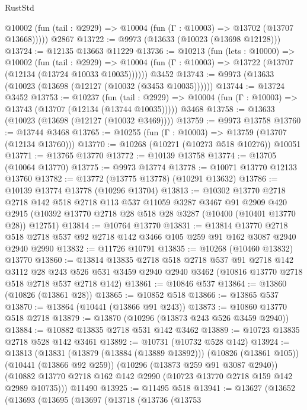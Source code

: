 \begin{lexlean}{RustStd}
\begin{coremodule}
      @10002 (fun (tail : @2929) => @10004 (fun (Γ : @10003) => @13702 (@13707 @13668)))))
    @2867
@13722 := @9973 (@13633 (@10023 (@13698 @12128)))
@13724 := @12135 @13663 @11229
@13736 := @10213
    (fun (lets : @10000) =>
    @10002
      (fun (tail : @2929) =>
      @10004 (fun (Γ : @10003) => @13722 (@13707 (@12134 (@13724 @10033 @10035))))))
    @3452
@13743 := @9973 (@13633 (@10023 (@13698 (@12127 (@10032 (@3453 @10035))))))
@13744 := @13724 @3452
@13753 := @10237
    (fun (tail : @2929) => @10004 (fun (Γ : @10003) => @13743 (@13707 (@12134 (@13744 @10035)))))
    @3468
@13758 := @13633 (@10023 (@13698 (@12127 (@10032 @3469))))
@13759 := @9973 @13758
@13760 := @13744 @3468
@13765 := @10255 (fun (Γ : @10003) => @13759 (@13707 (@12134 @13760)))
@13770 := @10268 (@10271 (@10273 @518 @10276)) @10051
@13771 := @13765 @13770
@13772 := @10139 @13758
@13774 := @13705 (@10064 @13770)
@13775 := @9973 @13774
@13778 := @10071 @13770 @12133 @13760
@13782 := @13772 (@13775 @13778) (@10291 @13632)
@13786 := @10139 @13774 @13778 (@10296 @13704)
@13813 := @10302
    @13770
    @2718
    @2718
    @142
    @518
    @2718
    @113
    @537
    @11059
    @3287
    @3467
    @91
    @2909
    @420
    @2915
    (@10392 @13770 @2718 @28 @518 @28 @3287 (@10400 (@10401 @13770 @28)) @12751)
@13814 := @10764 @13770
@13831 := @13814
    @13770
    @2718
    @518
    @2718
    @537
    @92
    @2718
    @142
    @3466
    @105
    @259
    @91
    @162
    @3087
    @2940
    @2940
    @2990
@13832 := @11726 @10791
@13835 := @10268 (@10460 @13832) @13770
@13860 := @13814
    @13835
    @2718
    @518
    @2718
    @537
    @91
    @2718
    @142
    @3112
    @28
    @243
    @526
    @531
    @3459
    @2940
    @2940
    @3462
    (@10816 @13770 @2718 @518 @2718 @537 @2718 @142)
@13861 := @10846 @537
@13864 := @13860 (@10826 (@13861 @28))
@13865 := @10852 @518
@13866 := @13865 @537
@13870 := @13864 (@10441 (@13866 @91 @243))
@13873 := @10860 @13770 @518 @2718
@13879 := @13870 (@10296 (@13873 @243 @526 @3459 @2940))
@13884 := @10882 @13835 @2718 @531 @142 @3462
@13889 := @10723 @13835 @2718 @528 @142 @3461
@13892 := @10731 (@10732 @528 @142)
@13924 := @13813
    (@13831
      (@13879 (@13884 (@13889 @13892)))
      (@10826 (@13861 @105))
      (@10441 (@13866 @92 @259))
      (@10296 (@13873 @259 @91 @3087 @2940))
      (@10882 @13770 @2718 @162 @142 @2990 (@10723 @13770 @2718 @159 @142 @2989 @10735)))
    @11490
@13925 := @11495 @518
@13941 := @13627
    (@13652
      (@13693
        (@13695
          (@13697
            (@13718
              (@13736
                (@13753

\end{coremodule}
\end{lexlean}
